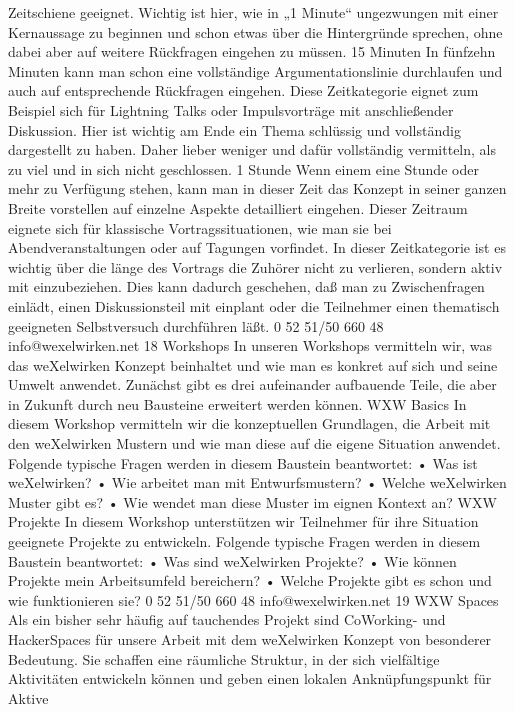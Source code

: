 Zeitschiene geeignet.
Wichtig ist hier, wie in „1 Minute“ ungezwungen mit einer Kernaussage zu beginnen und schon etwas 
über die Hintergründe sprechen, ohne dabei aber auf weitere Rückfragen eingehen zu müssen.
15 Minuten
In fünfzehn Minuten kann man schon eine vollständige Argumentationslinie durchlaufen und auch auf 
entsprechende Rückfragen eingehen. Diese Zeitkategorie eignet zum Beispiel sich für Lightning Talks 
oder Impulsvorträge mit anschließender Diskussion.
Hier ist wichtig am Ende ein Thema schlüssig und vollständig dargestellt zu haben. Daher lieber 
weniger und dafür vollständig vermitteln, als zu viel und in sich nicht geschlossen.
1 Stunde
Wenn einem eine Stunde oder mehr zu Verfügung stehen, kann man in dieser Zeit das Konzept in seiner 
ganzen Breite vorstellen auf einzelne Aspekte detailliert eingehen. Dieser Zeitraum eignete sich für 
klassische Vortragssituationen, wie man sie bei Abendveranstaltungen oder auf Tagungen vorfindet.
In dieser Zeitkategorie ist es wichtig über die länge des Vortrags die Zuhörer nicht zu verlieren, 
sondern aktiv mit einzubeziehen. Dies kann dadurch geschehen, daß man zu Zwischenfragen einlädt, 
einen Diskussionsteil mit einplant oder die Teilnehmer einen thematisch geeigneten Selbstversuch 
durchführen läßt. 
0 52 51/50 660 48
info@wexelwirken.net
18
Workshops
In unseren Workshops vermitteln wir, was das weXelwirken Konzept beinhaltet und wie man es konkret 
auf sich und seine Umwelt anwendet. Zunächst gibt es drei aufeinander aufbauende Teile, die aber in 
Zukunft durch neu Bausteine erweitert werden können.
WXW Basics
In diesem Workshop vermitteln wir die konzeptuellen Grundlagen, die Arbeit mit den weXelwirken 
Mustern und wie man diese auf die eigene Situation anwendet. Folgende typische Fragen werden in 
diesem Baustein beantwortet:
•
Was ist weXelwirken?
•
Wie arbeitet man mit Entwurfsmustern?
•
Welche weXelwirken Muster gibt es?
•
Wie wendet man diese Muster im eignen Kontext an?
WXW Projekte
In diesem Workshop unterstützen wir Teilnehmer für ihre Situation geeignete Projekte zu entwickeln. 
Folgende typische Fragen werden in diesem Baustein beantwortet:
•
Was sind weXelwirken Projekte?
•
Wie können Projekte mein Arbeitsumfeld bereichern?
•
Welche Projekte gibt es schon und wie funktionieren sie?
0 52 51/50 660 48
info@wexelwirken.net
19
WXW Spaces
Als ein bisher sehr häufig auf tauchendes Projekt sind CoWorking- und HackerSpaces für unsere Arbeit 
mit dem weXelwirken Konzept von besonderer Bedeutung. Sie schaffen eine räumliche Struktur, in der 
sich vielfältige Aktivitäten entwickeln können und geben einen lokalen Anknüpfungspunkt für Aktive 
